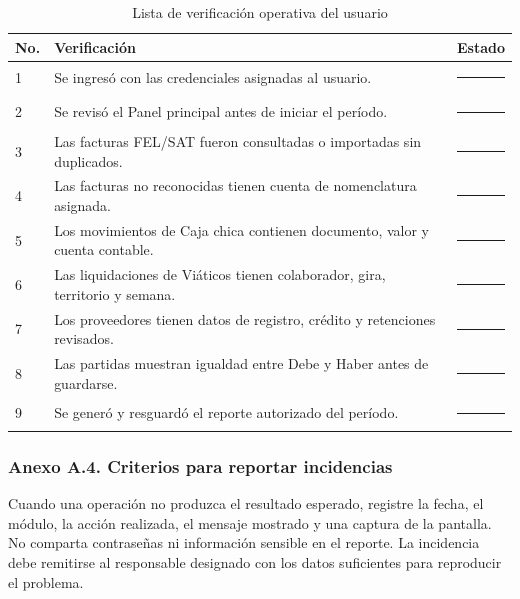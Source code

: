 \begin{longtable}{p{0.9cm}p{9.5cm}p{3.0cm}}
\caption{Lista de verificación operativa del usuario}\label{tab:A_checklist_usuario}\\
\toprule
\textbf{No.} & \textbf{Verificación} & \textbf{Estado}\\
\midrule
1 & Se ingresó con las credenciales asignadas al usuario. & \rule{2.5cm}{0.4pt}\\
2 & Se revisó el Panel principal antes de iniciar el período. & \rule{2.5cm}{0.4pt}\\
3 & Las facturas FEL/SAT fueron consultadas o importadas sin duplicados. & \rule{2.5cm}{0.4pt}\\
4 & Las facturas no reconocidas tienen cuenta de nomenclatura asignada. & \rule{2.5cm}{0.4pt}\\
5 & Los movimientos de Caja chica contienen documento, valor y cuenta contable. & \rule{2.5cm}{0.4pt}\\
6 & Las liquidaciones de Viáticos tienen colaborador, gira, territorio y semana. & \rule{2.5cm}{0.4pt}\\
7 & Los proveedores tienen datos de registro, crédito y retenciones revisados. & \rule{2.5cm}{0.4pt}\\
8 & Las partidas muestran igualdad entre Debe y Haber antes de guardarse. & \rule{2.5cm}{0.4pt}\\
9 & Se generó y resguardó el reporte autorizado del período. & \rule{2.5cm}{0.4pt}\\
\bottomrule
\end{longtable}

\subsubsection{Anexo A.4. Criterios para reportar incidencias}
Cuando una operación no produzca el resultado esperado, registre la fecha, el módulo, la acción realizada, el mensaje mostrado y una captura de la pantalla. No comparta contraseñas ni información sensible en el reporte. La incidencia debe remitirse al responsable designado con los datos suficientes para reproducir el problema.
